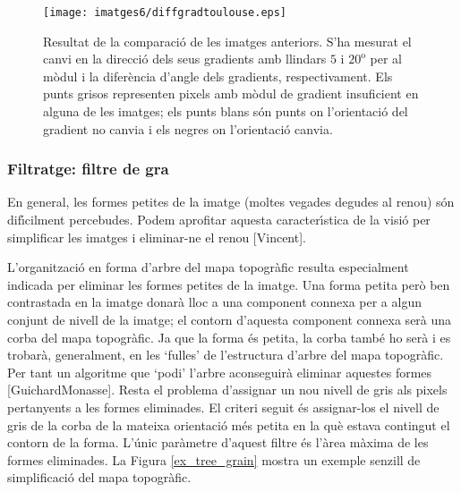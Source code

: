 \documentclass{article}
\begin{document}
\begin{figure}
\begin{center}
\texttt{[image: imatges6/diffgradtoulouse.eps]}
\end{center}
\caption{Resultat de la comparaci\'o de les imatges anteriors. S'ha mesurat el canvi en 
la direcci\'o dels seus gradients
amb llindars $5$ i $20^\text{o}$ per al m\`odul i la difer\`encia d'angle dels gradients, respectivament.
Els punts grisos representen pixels amb m\`odul de gradient insuficient en alguna de les imatges;
els punts blans s\'on punts on l'orientaci\'o del gradient no canvia i els negres on l'orientaci\'o canvia.}
\label{fig_changes}
\end{figure}

%


\newpage
\subsubsection{Filtratge: filtre de gra}

En general, les formes petites de la imatge (moltes vegades degudes al renou) s\'on dif\'\i cilment percebudes. 
Podem aprofitar aquesta caracter\'\i stica de la visi\'o per simplificar les imatges i eliminar-ne el renou
[Vincent].


L'organitzaci\'o en forma d'arbre del mapa topogr\`afic resulta especialment indicada per eliminar les
formes petites de la imatge. Una forma petita per\`o ben contrastada en la imatge donar\`a lloc a una component
connexa per a algun conjunt de nivell de la imatge; el contorn d'aquesta component connexa ser\`a una corba 
del mapa topogr\`afic. Ja que la forma \'es petita, la corba tamb\'e ho ser\`a i 
es trobar\`a, generalment, en les `fulles' de l'estructura d'arbre del mapa topogr\`afic. Per tant
un algoritme que `podi' l'arbre aconseguir\`a eliminar aquestes formes [GuichardMonasse]. 
Resta el problema d'assignar un nou 
nivell de gris als pixels pertanyents a les formes eliminades. El criteri seguit \'es assignar-los el nivell
de gris de la corba de la mateixa orientaci\'o m\'es petita en la qu\`e estava contingut el contorn de la forma. 
L'\'unic par\`ametre d'aquest filtre \'es l'\`area m\`axima de les formes eliminades.
La Figura \ref{ex_tree_grain} mostra un exemple senzill de simplificaci\'o del mapa topogr\`afic.
\end{document}
